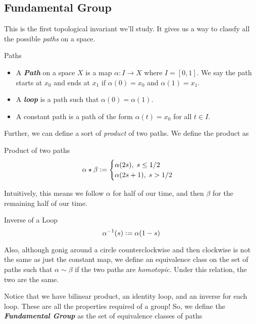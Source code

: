 \documentclass{article}
\newcommand{\defeq}{\vcentcolon=}
\begin{document}
\vskip 1cm
\subsection{Fundamental Group}

\vskip 0.25cm
This is the first topological invariant we'll study. It gives us a way to classfy all the possible \emph{paths} on a space.

\begin{mathdefinitionbox}{Paths}
  \begin{itemize}
    \item A \emph{\textbf{Path}} on a space $X$ is a map $\alpha : I \rightarrow X$ where $I = [0, 1]$. We say the path starts at $x_0$ and ends at $x_1$ if $\alpha(0) = x_0$ and $\alpha(1) = x_1$.
    \item A \emph{\textbf{loop}} is a path such that $\alpha(0) = \alpha(1)$.
    \item A constant path is a path of the form $\alpha(t) = x_0$ for all $t \in I$.
  \end{itemize}
\end{mathdefinitionbox}

\vskip 0.25cm
Further, we can define a sort of \emph{product} of two paths. We define the product as 

\begin{mathdefinitionbox}{Product of two paths}
  \[ \alpha \star \beta \defeq \begin{cases}
    \alpha(2s), \;s \leq 1/2 \\
    \alpha(2s+1), \;s > 1/2 \\
  \end{cases} \]
\end{mathdefinitionbox}

\vskip 0.25cm
Intuitively, this means we follow $\alpha$ for half of our time, and then $\beta$ for the remaining half of our time.

\vskip 0.25cm
\begin{mathdefinitionbox}{Inverse of a Loop} 
  \[ \alpha^{-1}(s) \defeq \alpha(1-s) \]
\end{mathdefinitionbox}

\vskip 0.25cm
Also, although gonig around a circle counterclockwise and then clockwise is not the same as just the constant map, we define an equivalence class on the set of paths such that $\alpha \sim \beta$ if the two paths are \emph{homotopic}. Under this relation, the two are the same.

\vskip 0.25cm
Notice that we have bilinear product, an identity loop, and an inverse for each loop. These are all the properties required of a group! So, we define the \emph{\textbf{Fundamental Group}} as the set of equivalence classes of paths
\end{document}
